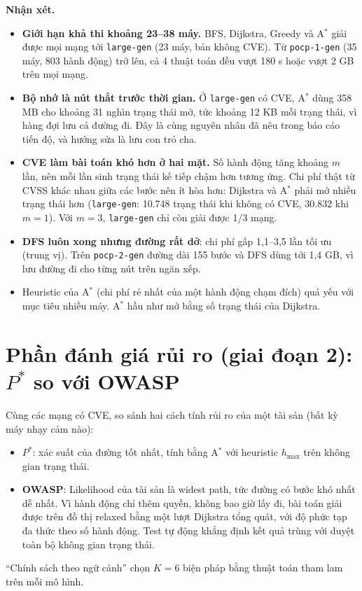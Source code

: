 \documentclass[11pt,a4paper]{article}
\begin{document}
\textbf{Nhận xét.}
\begin{itemize}
  \item \textbf{Giới hạn khả thi khoảng 23--38 máy.} BFS, Dijkstra, Greedy và A$^{*}$ giải được mọi mạng tới \texttt{large-gen} (23 máy, bản không CVE). Từ \texttt{pocp-1-gen} (35 máy, 803 hành động) trở lên, cả 4 thuật toán đều vượt 180 s hoặc vượt 2 GB trên mọi mạng.
  \item \textbf{Bộ nhớ là nút thắt trước thời gian.} Ở \texttt{large-gen} có CVE, A$^{*}$ dùng 358 MB cho khoảng 31 nghìn trạng thái mở, tức khoảng 12 KB mỗi trạng thái, vì hàng đợi lưu cả đường đi. Đây là cùng nguyên nhân đã nêu trong báo cáo tiến độ, và hướng sửa là lưu con trỏ cha.
  \item \textbf{CVE làm bài toán khó hơn ở hai mặt.} Số hành động tăng khoảng $m$ lần, nên mỗi lần sinh trạng thái kế tiếp chậm hơn tương ứng. Chi phí thật từ CVSS khác nhau giữa các bước nên ít hòa hơn: Dijkstra và A$^{*}$ phải mở nhiều trạng thái hơn (\texttt{large-gen}: 10.748 trạng thái khi không có CVE, 30.832 khi $m = 1$). Với $m = 3$, \texttt{large-gen} chỉ còn giải được 1/3 mạng.
  \item \textbf{DFS luôn xong nhưng đường rất dở}: chi phí gấp 1,1--3,5 lần tối ưu (trung vị). Trên \texttt{pocp-2-gen} đường dài 155 bước và DFS dùng tới 1,4 GB, vì lưu đường đi cho từng nút trên ngăn xếp.
  \item Heuristic của A$^{*}$ (chi phí rẻ nhất của một hành động chạm đích) quá yếu với mục tiêu nhiều máy. A$^{*}$ hầu như mở bằng số trạng thái của Dijkstra.
\end{itemize}

\section{Phần đánh giá rủi ro (giai đoạn 2): $P^{*}$ so với OWASP}

Cùng các mạng có CVE, so sánh hai cách tính rủi ro của một tài sản (bất kỳ máy nhạy cảm nào):
\begin{itemize}
  \item \textbf{$P^{*}$}: xác suất của đường tốt nhất, tính bằng A$^{*}$ với heuristic $h_{\max}$ trên không gian trạng thái.
  \item \textbf{OWASP}: Likelihood của tài sản là widest path, tức đường có bước khó nhất dễ nhất. Vì hành động chỉ thêm quyền, không bao giờ lấy đi, bài toán giải được trên đồ thị relaxed bằng một lượt Dijkstra tổng quát, với độ phức tạp đa thức theo số hành động. Test tự động khẳng định kết quả trùng với duyệt toàn bộ không gian trạng thái.
\end{itemize}
``Chính sách theo ngữ cảnh'' chọn $K = 6$ biện pháp bằng thuật toán tham lam trên mỗi mô hình.
\end{document}
